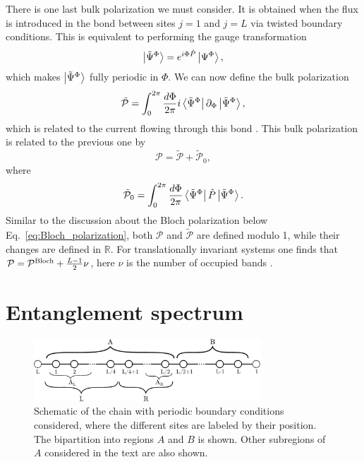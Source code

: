 \documentclass[twocolumn,amsmath,longbibliography,amssymb,superscriptaddress]{revtex4-1}
\begin{document}
There is one last bulk polarization we must consider. 
It is obtained when the flux is introduced in the bond between sites $j=1$ and $j=L$ via twisted boundary conditions. This is equivalent to performing the gauge transformation
\begin{align}\label{eq:Psi_tilde}
\ket{\tilde{\Psi}^\Phi}=e^{i\Phi \hat{P}}\ket{\Psi^\Phi},
\end{align}
which makes $\ket{\tilde{\Psi}^\Phi}$ fully periodic in $\Phi$. We can now define the bulk polarization
\begin{equation}
\tilde{\mathcal{P}} = \int_0^{2\pi}\frac{d\Phi}{2\pi} i\bra{\tilde{\Psi}^\Phi}\partial_\Phi \ket{\tilde{\Psi}^\Phi},
\label{eq:p_tilde}
\end{equation}
which is related to the current flowing through this bond \cite{Watanabe2018}. This bulk polarization is related to the previous one by 
\begin{equation}
\mathcal{P}= \tilde{\mathcal{P}}+\tilde{\mathcal{P}}_0,
\end{equation} 
where
\begin{equation}
\tilde {\mathcal{P}}_0= \int_0^{2\pi}\frac{d\Phi}{2\pi} \bra{\tilde{\Psi}^\Phi}\hat{P}\ket{\tilde{\Psi}^\Phi}.
\end{equation} 
Similar to the discussion about the Bloch polarization below Eq.~\eqref{eq:Bloch_polarization}, both $\mathcal{P}$ and $\tilde{\mathcal{P}}$ are defined modulo 1, while their changes are defined in $\mathbb{R}$. For translationally invariant systems one finds that $\mathcal{P} = \mathcal{P}^{\rm Bloch}+\frac{L-1}{2}\nu$, here $\nu$ is the number of occupied bands \cite{Watanabe2018}. 


\section{Entanglement spectrum}
\label{section:ES}

\begin{figure}[t]
	\centering
	\includegraphics[width=85mm]{chain.pdf}
	\caption{Schematic of the chain with periodic boundary conditions considered, where the different sites are labeled by their position. The bipartition into regions $A$ and $B$ is shown. Other subregions of $A$ considered in the text are also shown. }
\label{fig:chain}
\end{figure}
\end{document}
